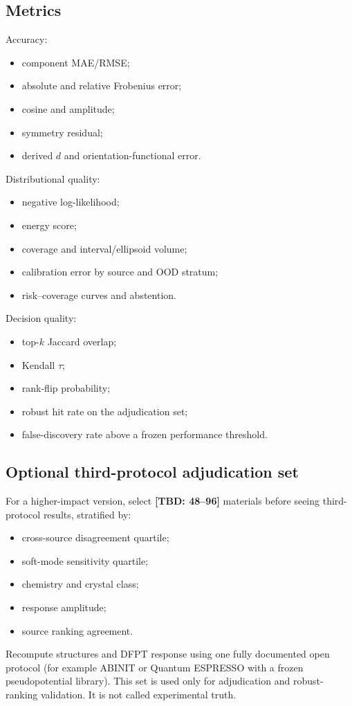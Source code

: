 \documentclass[11pt]{article}
\newcommand{\TBD}[1]{\textcolor{red!75!black}{\textbf{[TBD: #1]}}}
\begin{document}
\subsection{Metrics}

Accuracy:
\begin{itemize}[leftmargin=1.5em]
    \item component MAE/RMSE;
    \item absolute and relative Frobenius error;
    \item cosine and amplitude;
    \item symmetry residual;
    \item derived $d$ and orientation-functional error.
\end{itemize}

Distributional quality:
\begin{itemize}[leftmargin=1.5em]
    \item negative log-likelihood;
    \item energy score;
    \item coverage and interval/ellipsoid volume;
    \item calibration error by source and OOD stratum;
    \item risk--coverage curves and abstention.
\end{itemize}

Decision quality:
\begin{itemize}[leftmargin=1.5em]
    \item top-$k$ Jaccard overlap;
    \item Kendall $\tau$;
    \item rank-flip probability;
    \item robust hit rate on the adjudication set;
    \item false-discovery rate above a frozen performance threshold.
\end{itemize}

\subsection{Optional third-protocol adjudication set}

For a higher-impact version, select \TBD{48--96} materials before seeing third-protocol results, stratified by:
\begin{itemize}[leftmargin=1.5em]
    \item cross-source disagreement quartile;
    \item soft-mode sensitivity quartile;
    \item chemistry and crystal class;
    \item response amplitude;
    \item source ranking agreement.
\end{itemize}
Recompute structures and DFPT response using one fully documented open protocol (for example ABINIT or Quantum ESPRESSO with a frozen pseudopotential library). This set is used only for adjudication and robust-ranking validation. It is not called experimental truth.
\end{document}
